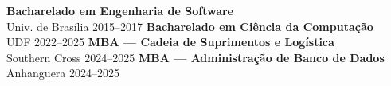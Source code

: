                       

\medskip
{}
      

\medskip
{}
\textbf{Bacharelado em Engenharia de Software}\\{\small Univ. de Brasília \textbullet{} 2015--2017}
\divider
\textbf{Bacharelado em Ciência da Computação}\\{\small UDF \textbullet{} 2022--2025}
\divider
\textbf{MBA — Cadeia de Suprimentos e Logística}\\{\small Southern Cross \textbullet{} 2024--2025}
\divider
\textbf{MBA — Administração de Banco de Dados}\\{\small Anhanguera \textbullet{} 2024--2025}
